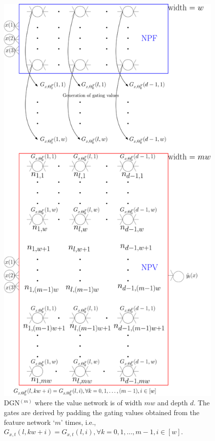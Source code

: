 \begin{appendix}
\FloatBarrier
\begin{figure}[!h]
\centering
\includegraphics[scale=0.1]{figs/dgn-infty-flipped.png}
\caption{DGN${}^{(m)}$ where the value network is of width $mw$ and depth $d$. The gates are derived by padding the gating values obtained from the feature network `$m$' times, i.e., $ G_{x,t}(l,kw+i)=G_{x,t}(l,i),\forall k=0,1,\ldots,m-1, i\in[w]$.}
\label{fig:dgnpad}
\end{figure}


\end{appendix}
